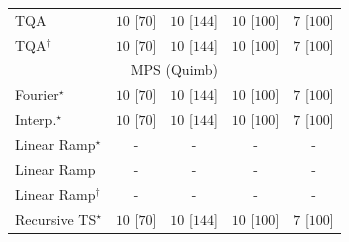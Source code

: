 \begin{tabular}{l|cccc|}
TQA & {\cellcolor[HTML]{00441B}} \color[HTML]{F1F1F1} $10$ [$70$] & {\cellcolor[HTML]{00441B}} \color[HTML]{F1F1F1} $10$ [$144$] & {\cellcolor[HTML]{00441B}} \color[HTML]{F1F1F1} $10$ [$100$] & {\cellcolor[HTML]{37A055}} \color[HTML]{F1F1F1} $7$ [$100$] \\
TQA$^\dagger$ & {\cellcolor[HTML]{00441B}} \color[HTML]{F1F1F1} $10$ [$70$] & {\cellcolor[HTML]{00441B}} \color[HTML]{F1F1F1} $10$ [$144$] & {\cellcolor[HTML]{00441B}} \color[HTML]{F1F1F1} $10$ [$100$] & {\cellcolor[HTML]{37A055}} \color[HTML]{F1F1F1} $7$ [$100$] \\
\cline{1-5}
\multicolumn{5}{c}{\rule{0pt}{8pt}MPS (Quimb)} \\
\midrule
Fourier$^\star$ & {\cellcolor[HTML]{00441B}} \color[HTML]{F1F1F1} $10$ [$70$] & {\cellcolor[HTML]{00441B}} \color[HTML]{F1F1F1} $10$ [$144$] & {\cellcolor[HTML]{00441B}} \color[HTML]{F1F1F1} $10$ [$100$] & {\cellcolor[HTML]{37A055}} \color[HTML]{F1F1F1} $7$ [$100$] \\
Interp.$^\star$ & {\cellcolor[HTML]{00441B}} \color[HTML]{F1F1F1} $10$ [$70$] & {\cellcolor[HTML]{00441B}} \color[HTML]{F1F1F1} $10$ [$144$] & {\cellcolor[HTML]{00441B}} \color[HTML]{F1F1F1} $10$ [$100$] & {\cellcolor[HTML]{37A055}} \color[HTML]{F1F1F1} $7$ [$100$] \\
Linear Ramp$^\star$ & {\cellcolor[HTML]{000000}} \color[HTML]{F1F1F1} {\cellcolor{white}} \color{black} - & {\cellcolor[HTML]{000000}} \color[HTML]{F1F1F1} {\cellcolor{white}} \color{black} - & {\cellcolor[HTML]{000000}} \color[HTML]{F1F1F1} {\cellcolor{white}} \color{black} - & {\cellcolor[HTML]{000000}} \color[HTML]{F1F1F1} {\cellcolor{white}} \color{black} - \\
Linear Ramp & {\cellcolor[HTML]{000000}} \color[HTML]{F1F1F1} {\cellcolor{white}} \color{black} - & {\cellcolor[HTML]{000000}} \color[HTML]{F1F1F1} {\cellcolor{white}} \color{black} - & {\cellcolor[HTML]{000000}} \color[HTML]{F1F1F1} {\cellcolor{white}} \color{black} - & {\cellcolor[HTML]{000000}} \color[HTML]{F1F1F1} {\cellcolor{white}} \color{black} - \\
Linear Ramp$^\dagger$ & {\cellcolor[HTML]{000000}} \color[HTML]{F1F1F1} {\cellcolor{white}} \color{black} - & {\cellcolor[HTML]{000000}} \color[HTML]{F1F1F1} {\cellcolor{white}} \color{black} - & {\cellcolor[HTML]{000000}} \color[HTML]{F1F1F1} {\cellcolor{white}} \color{black} - & {\cellcolor[HTML]{000000}} \color[HTML]{F1F1F1} {\cellcolor{white}} \color{black} - \\
Recursive TS$^\star$ & {\cellcolor[HTML]{00441B}} \color[HTML]{F1F1F1} $10$ [$70$] & {\cellcolor[HTML]{00441B}} \color[HTML]{F1F1F1} $10$ [$144$] & {\cellcolor[HTML]{00441B}} \color[HTML]{F1F1F1} $10$ [$100$] & {\cellcolor[HTML]{37A055}} \color[HTML]{F1F1F1} $7$ [$100$] \\

\end{tabular}
